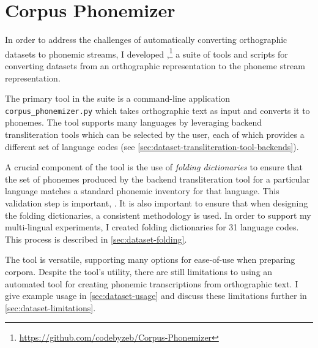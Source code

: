 \section{Corpus Phonemizer}
\label{sec:dataset-corpus-phonemizer}

In order to address the challenges of automatically converting orthographic datasets to phonemic streams, I developed \corpusphonemizer,\footnote{\url{https://github.com/codebyzeb/Corpus-Phonemizer}} a suite of tools and scripts for converting datasets from an orthographic representation to the phoneme stream representation.

The primary tool in the suite is a command-line application \texttt{corpus\_phonemizer.py} which takes orthographic text as input and converts it to phonemes. The tool supports many languages by leveraging backend transliteration tools which can be selected by the user, each of which provides a different set of language codes (see \cref{sec:dataset-transliteration-tool-backends}).

A crucial component of the tool is the use of \emph{folding dictionaries} to ensure that the set of phonemes produced by the backend transliteration tool for a particular language matches a standard phonemic inventory for that language. This validation step is important, . It is also important to ensure that when designing the folding dictionaries, a consistent methodology is used. In order to support my multi-lingual experiments, I created folding dictionaries for 31 language codes. This process is described in \cref{sec:dataset-folding}.

The tool is versatile, supporting many options for ease-of-use when preparing corpora. Despite the tool's utility, there are still limitations to using an automated tool for creating phonemic transcriptions from orthographic text. I give example usage in \cref{sec:dataset-usage} and discuss these limitations further in \cref{sec:dataset-limitations}.


